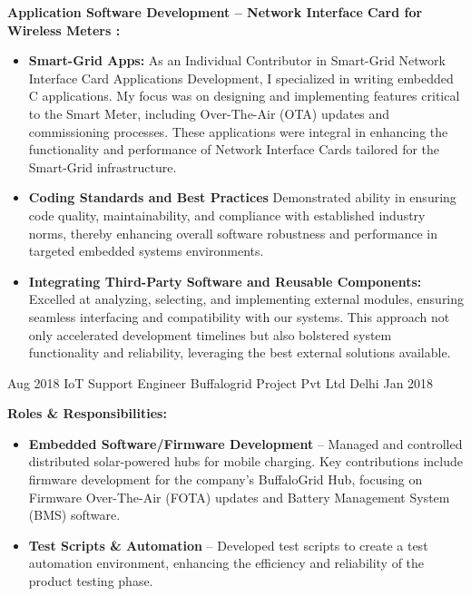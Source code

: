 \begin{experiences}
{        \textbf{Application Software Development – Network Interface Card for Wireless Meters :}
         \begin{itemize} 
             \item \textbf{Smart-Grid Apps:} {As an Individual Contributor in Smart-Grid Network Interface Card Applications Development, I specialized in writing embedded C applications. My focus was on designing and implementing features critical to the Smart Meter, including Over-The-Air (OTA) updates and commissioning processes. These applications were integral in enhancing the functionality and performance of Network Interface Cards tailored for the Smart-Grid infrastructure.}
             \item \textbf{Coding Standards and Best Practices} { Demonstrated ability in ensuring code quality, maintainability, and compliance with established industry norms, thereby enhancing overall software robustness and performance in targeted embedded systems environments.}  

             \item \textbf{Integrating Third-Party Software and Reusable Components:} {Excelled at analyzing, selecting, and implementing external modules, ensuring seamless interfacing and compatibility with our systems. This approach not only accelerated development timelines but also bolstered system functionality and reliability, leveraging the best external solutions available.}
              
         \end{itemize} 
        }
        {}       
        
\experience
  {Aug 2018}   %
  {IoT Support Engineer}  %
  {Buffalogrid Project Pvt Ltd}  %
  {Delhi}  %
  {Jan 2018}  %
  {   %
      \textbf{Roles \& Responsibilities:}
      \begin{itemize}
          \item \textbf{Embedded Software/Firmware Development} – Managed and controlled distributed solar-powered hubs for mobile charging. Key contributions include firmware development for the company's BuffaloGrid Hub, focusing on Firmware Over-The-Air (FOTA) updates and Battery Management System (BMS) software.
          \item \textbf{Test Scripts \& Automation} – Developed test scripts to create a test automation environment, enhancing the efficiency and reliability of the product testing phase.
      \end{itemize}    
  }
  {}  %


\end{experiences}

